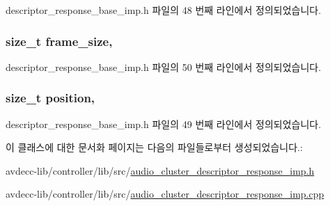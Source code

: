 descriptor\+\_\+response\+\_\+base\+\_\+imp.\+h 파일의 48 번째 라인에서 정의되었습니다.

\subsubsection[{\texorpdfstring{frame\+\_\+size}{frame_size}}]{\setlength{\rightskip}{0pt plus 5cm}size\+\_\+t frame\+\_\+size\hspace{0.3cm}{\ttfamily [protected]}, {\ttfamily [inherited]}}\hypertarget{classavdecc__lib_1_1descriptor__response__base__imp_affd041a595cabab98275245b9cb2824d}{}\label{classavdecc__lib_1_1descriptor__response__base__imp_affd041a595cabab98275245b9cb2824d}


descriptor\+\_\+response\+\_\+base\+\_\+imp.\+h 파일의 50 번째 라인에서 정의되었습니다.

\subsubsection[{\texorpdfstring{position}{position}}]{\setlength{\rightskip}{0pt plus 5cm}size\+\_\+t position\hspace{0.3cm}{\ttfamily [protected]}, {\ttfamily [inherited]}}\hypertarget{classavdecc__lib_1_1descriptor__response__base__imp_a7a04afe5347934be732ec70a70bd0a28}{}\label{classavdecc__lib_1_1descriptor__response__base__imp_a7a04afe5347934be732ec70a70bd0a28}


descriptor\+\_\+response\+\_\+base\+\_\+imp.\+h 파일의 49 번째 라인에서 정의되었습니다.



이 클래스에 대한 문서화 페이지는 다음의 파일들로부터 생성되었습니다.\+:\begin{DoxyCompactItemize}
\item 
avdecc-\/lib/controller/lib/src/\hyperlink{audio__cluster__descriptor__response__imp_8h}{audio\+\_\+cluster\+\_\+descriptor\+\_\+response\+\_\+imp.\+h}\item 
avdecc-\/lib/controller/lib/src/\hyperlink{audio__cluster__descriptor__response__imp_8cpp}{audio\+\_\+cluster\+\_\+descriptor\+\_\+response\+\_\+imp.\+cpp}\end{DoxyCompactItemize}
